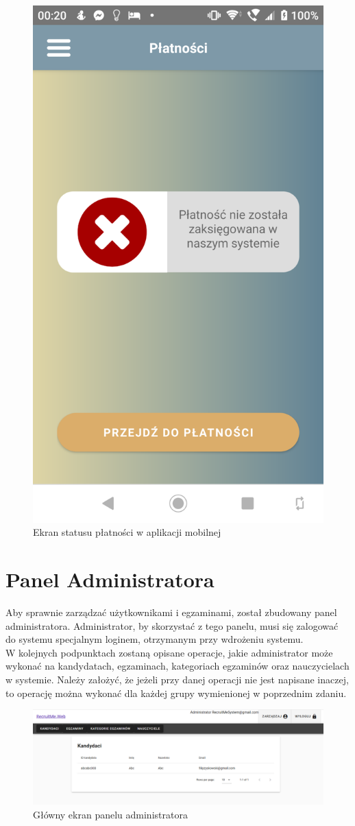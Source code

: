 \documentclass{article}
\begin{document}
\begin{figure}[H]
    \centering
    \includegraphics[width=0.45\linewidth]{images/mobile/payment.png}
    \caption{Ekran statusu płatności w aplikacji mobilnej}
    \label{fig:test3_label}
\end{figure}

\section{Panel Administratora}
Aby sprawnie zarządzać użytkownikami i egzaminami, został zbudowany panel administratora. Administrator, by skorzystać z tego panelu, musi się zalogować do systemu specjalnym loginem, otrzymanym przy wdrożeniu systemu. \\
W kolejnych podpunktach zostaną opisane operacje, jakie administrator może wykonać na kandydatach, egzaminach, kategoriach egzaminów oraz nauczycielach w systemie. Należy założyć, że jeżeli przy danej operacji nie jest napisane inaczej, to operację można wykonać dla każdej grupy wymienionej w poprzednim zdaniu.
\begin{figure}[H]
    \centering
    \includegraphics[width=1\linewidth]{images/web/ap_vi.png}
    \caption{Główny ekran panelu administratora}
    \label{fig:test3_label}
\end{figure}
\end{document}
